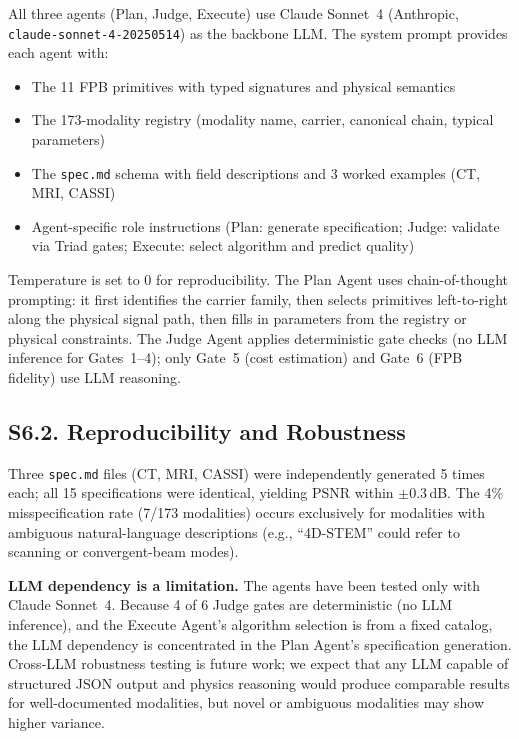\documentclass[11pt,a4paper]{article}
\begin{document}
All three agents (Plan, Judge, Execute) use Claude Sonnet~4 (Anthropic, \texttt{claude-sonnet-4-20250514}) as the backbone LLM.  The system prompt provides each agent with:
\begin{itemize}[nosep]
\item The 11 FPB primitives with typed signatures and physical semantics
\item The 173-modality registry (modality name, carrier, canonical chain, typical parameters)
\item The \texttt{spec.md} schema with field descriptions and 3 worked examples (CT, MRI, CASSI)
\item Agent-specific role instructions (Plan: generate specification; Judge: validate via Triad gates; Execute: select algorithm and predict quality)
\end{itemize}

Temperature is set to 0 for reproducibility.  The Plan Agent uses chain-of-thought prompting: it first identifies the carrier family, then selects primitives left-to-right along the physical signal path, then fills in parameters from the registry or physical constraints.  The Judge Agent applies deterministic gate checks (no LLM inference for Gates~1--4); only Gate~5 (cost estimation) and Gate~6 (FPB fidelity) use LLM reasoning.

\subsection{S6.2. Reproducibility and Robustness}

Three \texttt{spec.md} files (CT, MRI, CASSI) were independently generated 5 times each; all 15 specifications were identical, yielding PSNR within $\pm 0.3$\,dB.  The 4\% misspecification rate (7/173 modalities) occurs exclusively for modalities with ambiguous natural-language descriptions (e.g., ``4D-STEM'' could refer to scanning or convergent-beam modes).

\textbf{LLM dependency is a limitation.}  The agents have been tested only with Claude Sonnet~4.  Because 4 of 6 Judge gates are deterministic (no LLM inference), and the Execute Agent's algorithm selection is from a fixed catalog, the LLM dependency is concentrated in the Plan Agent's specification generation.  Cross-LLM robustness testing is future work; we expect that any LLM capable of structured JSON output and physics reasoning would produce comparable results for well-documented modalities, but novel or ambiguous modalities may show higher variance.
\end{document}
